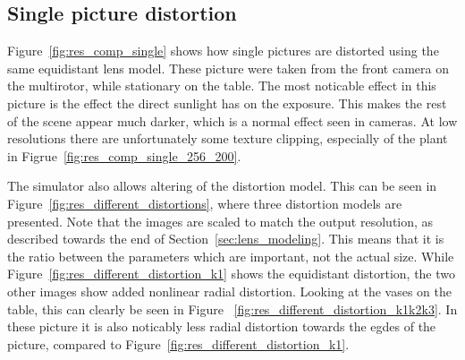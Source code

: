 \subsection{Single picture distortion}

Figure~\ref{fig:res_comp_single} shows how single pictures are distorted using the same equidistant lens model. These picture were taken from the front camera on the multirotor, while stationary on the table. The most noticable effect in this picture is the effect the direct sunlight has on the exposure. This makes the rest of the scene appear much darker, which is a normal effect seen in cameras. At low resolutions there are unfortunately some texture clipping, especially of the plant in Figrue~\ref{fig:res_comp_single_256_200}.

The simulator also allows altering of the distortion model. This can be seen in Figure~\ref{fig:res_different_distortions}, where three distortion models are presented. Note that the images are scaled to match the output resolution, as described towards the end of Section~\ref{sec:lens_modeling}. This means that it is the ratio between the parameters which are important, not the actual size. While Figure~\ref{fig:res_different_distortion_k1} shows the equidistant distortion, the two other images show added nonlinear radial distortion. Looking at the vases on the table, this can clearly be seen in Figure~ \ref{fig:res_different_distortion_k1k2k3}. In these picture it is also noticably less radial distortion towards the egdes of the picture, compared to Figure~\ref{fig:res_different_distortion_k1}.

